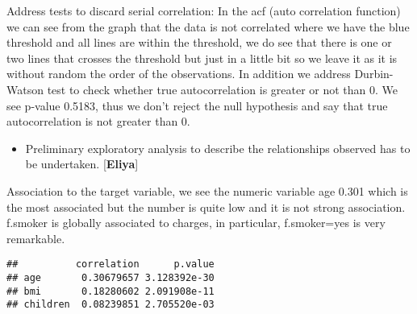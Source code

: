 \documentclass[
]{article}
\newenvironment{Shaded}{\begin{snugshade}}{\end{snugshade}}
\newcommand{\AttributeTok}[1]{\textcolor[rgb]{0.77,0.63,0.00}{#1}}
\newcommand{\CommentTok}[1]{\textcolor[rgb]{0.56,0.35,0.01}{\textit{#1}}}
\newcommand{\DecValTok}[1]{\textcolor[rgb]{0.00,0.00,0.81}{#1}}
\newcommand{\FloatTok}[1]{\textcolor[rgb]{0.00,0.00,0.81}{#1}}
\newcommand{\FunctionTok}[1]{\textcolor[rgb]{0.00,0.00,0.00}{#1}}
\newcommand{\NormalTok}[1]{#1}
\newcommand{\OtherTok}[1]{\textcolor[rgb]{0.56,0.35,0.01}{#1}}
\newcommand{\SpecialCharTok}[1]{\textcolor[rgb]{0.00,0.00,0.00}{#1}}
\providecommand{\tightlist}{%
  \setlength{\itemsep}{0pt}\setlength{\parskip}{0pt}}
\begin{document}
Address tests to discard serial correlation: In the acf (auto
correlation function) we can see from the graph that the data is not
correlated where we have the blue threshold and all lines are within the
threshold, we do see that there is one or two lines that crosses the
threshold but just in a little bit so we leave it as it is without
random the order of the observations. In addition we address
Durbin-Watson test to check whether true autocorrelation is greater or
not than 0. We see p-value 0.5183, thus we don't reject the null
hypothesis and say that true autocorrelation is not greater than 0.

\begin{itemize}
\tightlist
\item
  Preliminary exploratory analysis to describe the relationships
  observed has to be undertaken. {[}\textbf{Eliya}{]}
\end{itemize}

Association to the target variable, we see the numeric variable age
0.301 which is the most associated but the number is quite low and it is
not strong association. f.smoker is globally associated to charges, in
particular, f.smoker=yes is very remarkable.

\begin{Shaded}
\end{Shaded}

\begin{verbatim}
##          correlation      p.value
## age       0.30679657 3.128392e-30
## bmi       0.18280602 2.091908e-11
## children  0.08239851 2.705520e-03
\end{verbatim}

\begin{Shaded}
\end{Shaded}
\end{document}
